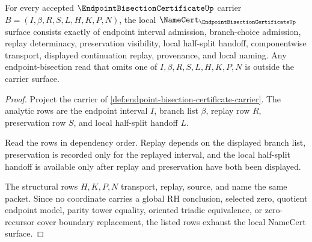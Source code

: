 \begin{theorem}
\label{thm:endpoint-bisection-certificate-namecert-surface}
For every accepted $\EndpointBisectionCertificateUp$ carrier $B=(I,\beta,R,S,L,H,K,P,N)$, the local $\NameCert_{\EndpointBisectionCertificateUp}$ surface consists exactly of endpoint interval admission, branch-choice admission, replay determinacy, preservation visibility, local half-split handoff, componentwise transport, displayed continuation replay, provenance, and local naming. Any endpoint-bisection read that omits one of $I,\beta,R,S,L,H,K,P,N$ is outside the carrier surface.
\end{theorem}
\begin{proof}
Project the carrier of \autoref{def:endpoint-bisection-certificate-carrier}. The analytic rows are the endpoint interval $I$, branch list $\beta$, replay row $R$, preservation row $S$, and local half-split handoff $L$.

Read the rows in dependency order. Replay depends on the displayed branch list, preservation is recorded only for the replayed interval, and the local half-split handoff is available only after replay and preservation have both been displayed.

The structural rows $H,K,P,N$ transport, replay, source, and name the same packet. Since no coordinate carries a global RH conclusion, selected zero, quotient endpoint model, parity tower equality, oriented triadic equivalence, or zero-recursor cover boundary replacement, the listed rows exhaust the local NameCert surface.
\end{proof}

